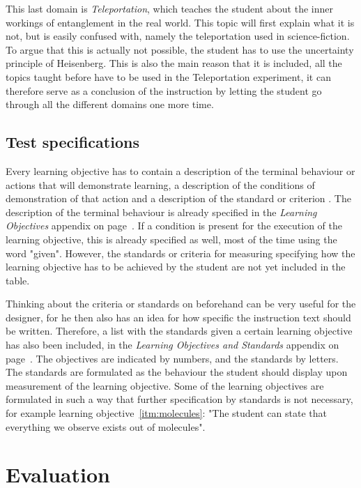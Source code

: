 \documentclass[11pt,twoside]{report} %
\begin{document}
This last domain is \emph{Teleportation}, which teaches the student about the inner workings of entanglement in the real world. This topic will first explain what it is not, but is easily confused with, namely the teleportation used in science-fiction. To argue that this is actually not possible, the student has to use the uncertainty principle of Heisenberg. This is also the main reason that it is included, all the topics taught before have to be used in the Teleportation experiment, it can therefore  serve as a conclusion of the instruction by letting the student go through all the different domains one more time.

\subsection{Test specifications}

Every learning objective has to contain a description of the terminal behaviour or actions that will demonstrate learning, a description of the conditions of demonstration of that action and a description of the standard or criterion \cite{smithragan}. The description of the terminal behaviour is already specified in the \emph{Learning Objectives} appendix on page~\pageref{app:learningobjectives}. If a condition is present for the execution of the learning objective, this is already specified as well, most of the time using the word "given". However, the standards or criteria for measuring specifying how the learning objective has to be achieved by the student are not yet included in the table.

Thinking about the criteria or standards on beforehand can be very useful for the designer, for he then also has an idea for how specific the instruction text should be written. Therefore, a list with the standards given a certain learning objective has also been included, in the \emph{Learning Objectives and Standards} appendix on page~\pageref{app:objectivestandards}. The objectives are indicated by numbers, and the standards by letters. The standards are formulated as the behaviour the student should display upon measurement of the learning objective. Some of the learning objectives are formulated in such a way that further specification by standards is not necessary, for example learning objective~\ref{itm:molecules}: "The student can state that everything we observe exists out of molecules".

\section{Evaluation}
\end{document}
